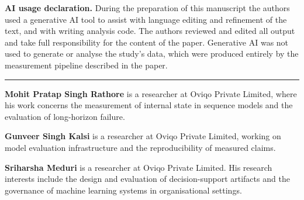 \documentclass[11pt]{article}
\begin{document}
\vspace{0.6em}
\noindent\textbf{AI usage declaration.} During the preparation of this manuscript
the authors used a generative AI tool to assist with language editing and refinement
of the text, and with writing analysis code. The authors reviewed and edited all
output and take full responsibility for the content of the paper. Generative AI was
not used to generate or analyse the study's data, which were produced entirely by
the measurement pipeline described in the paper.

\vspace{2em}
\noindent\rule{\linewidth}{0.4pt}

\vspace{1em}

\vspace{0.8em}
\noindent\textbf{Mohit Pratap Singh Rathore} is a researcher at Oviqo Private
Limited, where his work concerns the measurement of internal state in sequence
models and the evaluation of long-horizon failure.

\vspace{0.6em}
\noindent\textbf{Gunveer Singh Kalsi} is a researcher at Oviqo Private Limited,
working on model evaluation infrastructure and the reproducibility of measured
claims.

\vspace{0.6em}
\noindent\textbf{Sriharsha Meduri} is a researcher at Oviqo Private Limited. His
research interests include the design and evaluation of decision-support artifacts
and the governance of machine learning systems in organisational settings.
\end{document}
